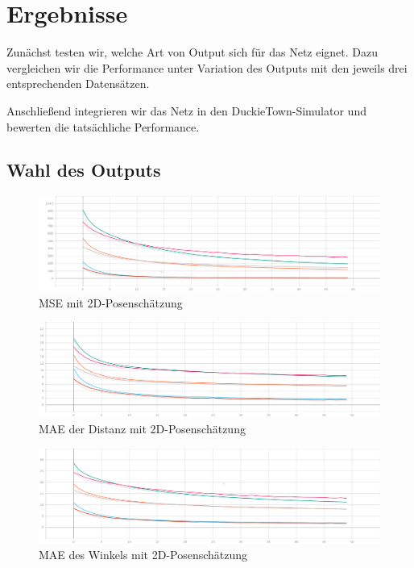 \chapter{Ergebnisse}

Zunächst testen wir, welche Art von Output sich für das Netz eignet. Dazu vergleichen wir die Performance unter Variation des Outputs mit den jeweils drei entsprechenden Datensätzen.

Anschließend integrieren wir das Netz in den DuckieTown-Simulator und bewerten die tatsächliche Performance.

\section{Wahl des Outputs}

\begin{figure}[H]
	\centering
	\includegraphics[width=\linewidth]{kapitel5/images//single-loss/Loss-single-loss.png}
	\caption{MSE mit 2D-Posenschätzung}
	\label{2d-poses-mse}
\end{figure}

\begin{figure}[H]
	\centering
	\includegraphics[width=\linewidth]{kapitel5/images/single-loss/Mean_Abs_Error_d-single-loss.png}
	\caption{MAE der Distanz mit 2D-Posenschätzung}
	\label{2d-poses-mae-d}
\end{figure}

\begin{figure}[H]
	\centering
	\includegraphics[width=\linewidth]{kapitel5/images/single-loss/Mean_Abs_Error_a-single-loss.png}
	\caption{MAE des Winkels mit 2D-Posenschätzung}
	\label{2d-poses-mae-a}
\end{figure}
